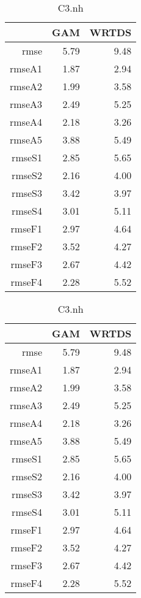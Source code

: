 \documentclass[12pt]{amsart}
\begin{document}
\begin{table}[H]
\centering
\begin{tabular}{rrr}
  \hline
 & GAM & WRTDS \\ 
  \hline
rmse & 5.79 & 9.48 \\ 
  rmseA1 & 1.87 & 2.94 \\ 
  rmseA2 & 1.99 & 3.58 \\ 
  rmseA3 & 2.49 & 5.25 \\ 
  rmseA4 & 2.18 & 3.26 \\ 
  rmseA5 & 3.88 & 5.49 \\ 
  rmseS1 & 2.85 & 5.65 \\ 
  rmseS2 & 2.16 & 4.00 \\ 
  rmseS3 & 3.42 & 3.97 \\ 
  rmseS4 & 3.01 & 5.11 \\ 
  rmseF1 & 2.97 & 4.64 \\ 
  rmseF2 & 3.52 & 4.27 \\ 
  rmseF3 & 2.67 & 4.42 \\ 
  rmseF4 & 2.28 & 5.52 \\ 
   \hline
\end{tabular}
\caption{C3.nh}
\end{table}

\begin{table}[H]
\centering
\begin{tabular}{rrr}
  \hline
 & GAM & WRTDS \\ 
  \hline
rmse & 5.79 & 9.48 \\ 
  rmseA1 & 1.87 & 2.94 \\ 
  rmseA2 & 1.99 & 3.58 \\ 
  rmseA3 & 2.49 & 5.25 \\ 
  rmseA4 & 2.18 & 3.26 \\ 
  rmseA5 & 3.88 & 5.49 \\ 
  rmseS1 & 2.85 & 5.65 \\ 
  rmseS2 & 2.16 & 4.00 \\ 
  rmseS3 & 3.42 & 3.97 \\ 
  rmseS4 & 3.01 & 5.11 \\ 
  rmseF1 & 2.97 & 4.64 \\ 
  rmseF2 & 3.52 & 4.27 \\ 
  rmseF3 & 2.67 & 4.42 \\ 
  rmseF4 & 2.28 & 5.52 \\ 
   \hline
\end{tabular}
\caption{C3.nh}
\end{table}
\end{document}

